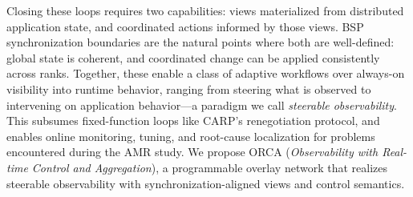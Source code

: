 Closing these loops requires two capabilities: views materialized from distributed application
state, and coordinated actions informed by those views.
BSP synchronization boundaries are the natural points where both are well-defined: global state
is coherent, and coordinated change can be applied consistently across ranks.
Together, these enable a class of adaptive workflows over always-on visibility into runtime
behavior, ranging from steering what is observed to intervening on application
behavior---a paradigm we call \emph{steerable observability}.
This subsumes fixed-function loops like CARP's renegotiation protocol, and enables online
monitoring, tuning, and root-cause localization for problems encountered during the AMR study.
We propose ORCA (\emph{Observability with Real-time Control and Aggregation}), a programmable
overlay network that realizes steerable observability with synchronization-aligned views and
control semantics.


